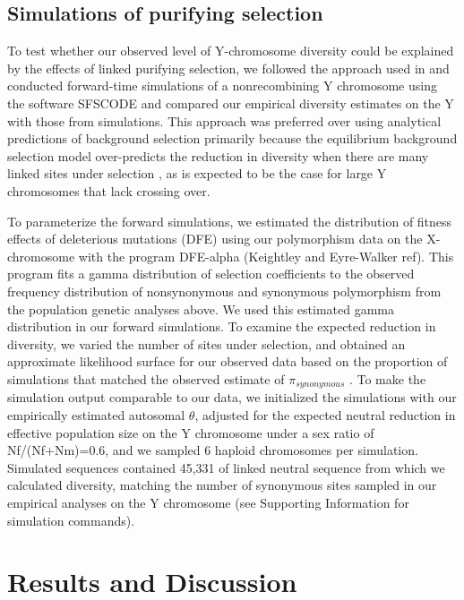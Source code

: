 \documentclass[9pt,twocolumn,twoside]{gsajnl}
\begin{document}
\subsection*{Simulations of purifying selection}
To test whether our observed level of Y-chromosome diversity could be explained by the effects of linked purifying selection, we followed the approach used in \citep{Wilsonsayres2014} and conducted forward-time simulations of a nonrecombining Y chromosome using the software SFSCODE \citep{hernandez2008flexible} and compared our empirical diversity estimates on the Y with those from simulations. This approach was preferred over using analytical predictions of background selection primarily because the equilibrium background selection model over-predicts the reduction in diversity when there are many linked sites under selection \citep{KaiserCharlesworth}, as is expected to be the case for large Y chromosomes that lack crossing over.

To parameterize the forward simulations, we estimated the distribution of fitness effects of deleterious mutations (DFE) using our polymorphism data on the X-chromosome with the program DFE-alpha (Keightley and Eyre-Walker ref). This program fits a gamma distribution of selection coefficients to the observed frequency distribution of nonsynonymous and synonymous polymorphism from the population genetic analyses above. We used this estimated gamma distribution in our forward simulations. To examine the expected reduction in diversity, we varied the number of sites under selection, and obtained an approximate likelihood surface for our observed data based on the proportion of simulations that matched the observed estimate of $\pi_{synonymous}$ . To make the simulation output comparable to our data, we initialized the simulations with our empirically estimated autosomal $\theta$, adjusted for the expected neutral reduction in effective population size on the Y chromosome under a sex ratio of Nf/(Nf+Nm)=0.6, and we sampled 6 haploid chromosomes per simulation. Simulated sequences contained 45,331 of linked neutral sequence from which we calculated diversity, matching the number of synonymous sites sampled in our empirical analyses on the Y chromosome (see Supporting Information for simulation commands).



\section*{Results and Discussion}
\end{document}
